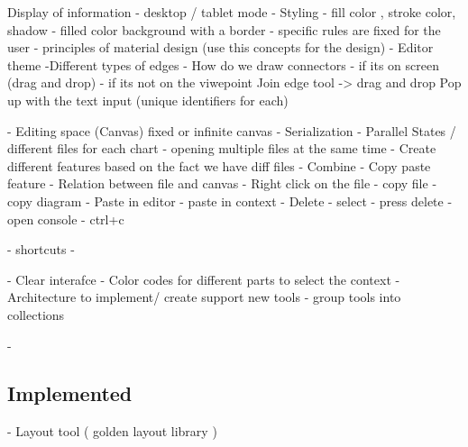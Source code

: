  Display of information 
 	- desktop / tablet mode 
- Styling 
	- fill color , stroke color, shadow
	- filled color background with a border
	- specific rules are fixed for the user
	- principles of material design (use this concepts for the design)
	- Editor theme
	-Different types of edges
	- How do we draw connectors
		- if its on screen (drag and drop)
		- if its not on the viwepoint 
	Join edge tool -> drag and drop
	Pop up with the text input (unique identifiers for each)
	
- Editing space (Canvas) fixed or infinite canvas 
- Serialization 
- Parallel States / different files for each chart  
- opening multiple files at the same time 
- Create different features based on the fact we have diff files - Combine 
- Copy paste feature 
- Relation between file and canvas 
- Right click on the file 
	- copy file 
	- copy diagram  
	- Paste in editor  
	- paste in context  
	- Delete 
- select  
	- press delete 
	- open console 
	- ctrl+c 
	
- shortcuts 
- 

- Clear interafce 
- Color codes for different parts to select the context 
- Architecture to implement/ create support new tools 
- group tools into collections 
	

-\subsection{Implemented}

- Layout tool ( golden layout library ) 


